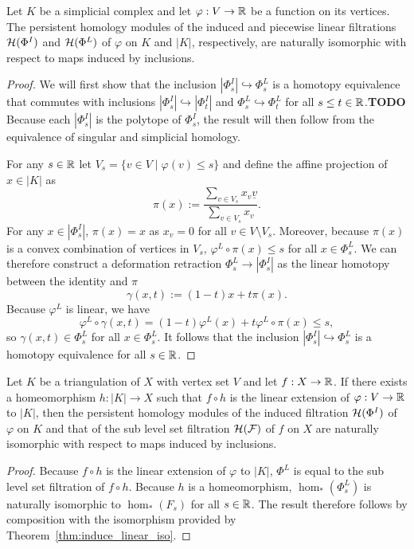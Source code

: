 \begin{theorem}\label{thm:induce_linear_iso}
  Let $K$ be a simplicial complex and let $\varphi : V\to\mathbb{R}$ be a function on its vertices.
  The persistent homology modules of the induced and piecewise linear filtrations $\mathcal{H}(\Phi^I)$ and $\mathcal{H}(\Phi^L)$ of $\varphi$ on $K$ and $|K|$, respectively, are naturally isomorphic with respect to maps induced by inclusions.
\end{theorem}
\begin{proof}
  We will first show that the inclusion $|\Phi^I_s|\hookrightarrow \Phi^L_s$ is a homotopy equivalence that commutes with inclusions $|\Phi^I_s|\hookrightarrow |\Phi^I_t|$ and $\Phi^L_s\hookrightarrow \Phi^L_t$ for all $s\leq t\in\mathbb{R}$.\textbf{TODO}
  Because each $|\Phi^I_s|$ is the polytope of $\Phi^I_s$, the result will then follow from the equivalence of singular and simplicial homology.

  For any $s\in\mathbb{R}$ let $V_s = \{ v\in V\mid \varphi(v)\leq s\}$ and define the affine projection of $x\in |K|$ as
  \[ \pi(x) := \frac{\sum_{v\in V_s} x_v \underline{v}}{\sum_{v\in V_s} x_v}.\]
  For any $x\in |\Phi_s^I|$, $\pi(x) = x$ as $x_v = 0$ for all $v\in V\setminus V_s$.
  Moreover, because $\pi(x)$ is a convex combination of vertices in $V_s$, $\varphi^L\circ \pi(x)\leq s$ for all $x\in\Phi_s^L$.
  We can therefore construct a deformation retraction $\Phi^L_s\to |\Phi^I_s|$ as the linear homotopy between the identity and $\pi$
  \[ \gamma(x, t) := (1-t)x + t\pi(x).\]
  Because $\varphi^L$ is linear, we have
  \[ \varphi^L\circ \gamma(x,t) = (1-t)\varphi^L(x) + t\varphi^L\circ \pi(x)\leq s,\]
  so $\gamma(x,t)\in\Phi_s^L$ for all $x\in \Phi_s^L$.
  It follows that the inclusion $|\Phi^I_s|\hookrightarrow \Phi^L_s$ is a homotopy equivalence for all $s\in\mathbb{R}$.
\end{proof}


\begin{corollary}\label{cor:induce_sublevel_iso}
  Let $K$ be a triangulation of $X$ with vertex set $V$ and let $f : X\to \mathbb{R}$.
  If there exists a homeomorphism $h : |K|\to X$ such that $f\circ h$ is the linear extension of $\varphi : V\to \mathbb{R}$ to $|K|$, then the persistent homology modules of the induced filtration $\mathcal{H}(\Phi^I)$ of $\varphi$ on $K$ and that of the sub level set filtration $\mathcal{H}(\mathcal{F})$ of $f$ on $X$ are naturally isomorphic with respect to maps induced by inclusions.
\end{corollary}
\begin{proof}
  Because $f\circ h$ is the linear extension of $\varphi$ to $|K|$, $\Phi^L$ is equal to the sub level set filtration of $f\circ h$.
  Because $h$ is a homeomorphism, $\hom_*(\Phi_s^L)$ is naturally isomorphic to $\hom_*(F_s)$ for all $s\in\mathbb{R}$.
  The result therefore follows by composition with the isomorphism provided by Theorem~\ref{thm:induce_linear_iso}.
\end{proof}

